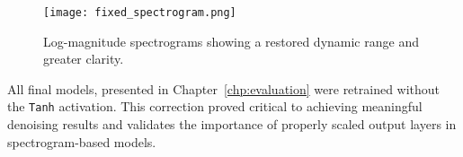 \begin{figure}[H]
    \centering
    \texttt{[image: fixed\_spectrogram.png]}
    \caption{\label{fig:restored_spectrogram} Log-magnitude spectrograms showing a restored dynamic range and greater clarity.}
\end{figure}

All final models, presented in Chapter~\ref{chp:evaluation} were retrained without the \texttt{Tanh} activation. This correction proved critical to achieving meaningful denoising results and validates the importance of properly scaled output layers in spectrogram-based models.
